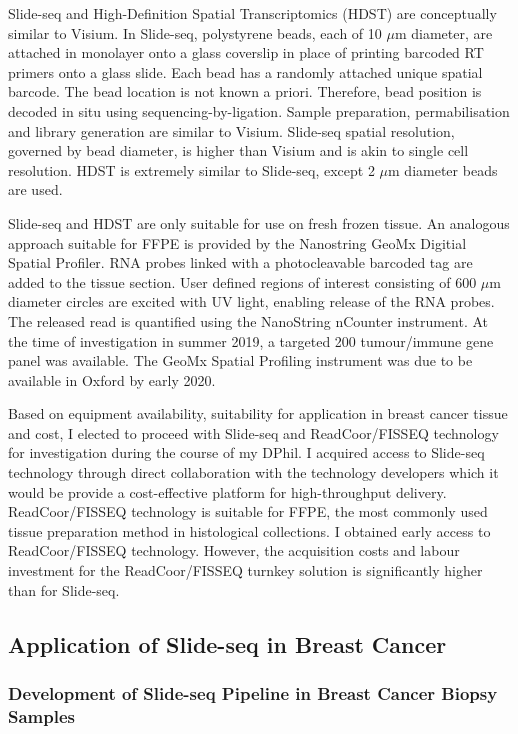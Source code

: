 Slide-seq and High-Definition Spatial Transcriptomics (HDST) are conceptually similar to Visium. In Slide-seq, polystyrene beads, each of 10 $\mu$m diameter, are attached in monolayer onto a glass coverslip in place of printing barcoded RT primers onto a glass slide. Each bead has a randomly attached unique spatial barcode. The bead location is not known a priori. Therefore, bead position is decoded in situ using sequencing-by-ligation. Sample preparation, permabilisation and library generation are similar to Visium. Slide-seq spatial resolution, governed by bead diameter, is higher than Visium and is akin to single cell resolution. HDST is extremely similar to Slide-seq, except 2 $\mu$m diameter beads are used.

Slide-seq and HDST are only suitable for use on fresh frozen tissue. An analogous approach suitable for FFPE is provided by the Nanostring GeoMx Digitial Spatial Profiler. RNA probes linked with a photocleavable barcoded tag are added to the tissue section. User defined regions of interest consisting of 600 $\mu$m diameter circles are excited with UV light, enabling release of the RNA probes. The released read is quantified using the NanoString nCounter instrument. At the time of investigation in summer 2019, a targeted 200 tumour/immune gene panel was available. The GeoMx Spatial Profiling instrument was due to be available in Oxford by early 2020.

Based on equipment availability, suitability for application in breast cancer tissue and cost, I elected to proceed with Slide-seq and ReadCoor/FISSEQ technology for investigation during the course of my DPhil. I acquired access to Slide-seq technology through direct collaboration with the technology developers which it would be provide a cost-effective platform for high-throughput delivery. ReadCoor/FISSEQ technology is suitable for FFPE, the most commonly used tissue preparation method in histological collections. I obtained early access to ReadCoor/FISSEQ technology. However, the acquisition costs and labour investment for the ReadCoor/FISSEQ turnkey solution is significantly higher than for Slide-seq.


\subsection{Application of Slide-seq in Breast Cancer}
\subsubsection{Development of Slide-seq Pipeline in Breast Cancer Biopsy Samples}

